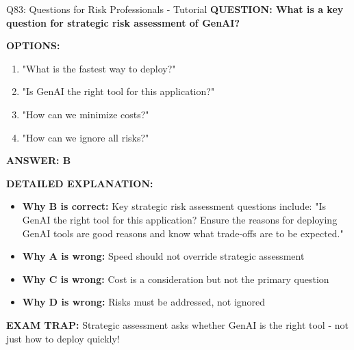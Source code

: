 \documentclass[8pt]{beamer}
\begin{document}
	\begin{frame}{Q83: Questions for Risk Professionals - Tutorial}
		\fontsize{6.5}{7.5}\selectfont
		\textbf{QUESTION: What is a key question for strategic risk assessment of GenAI?}
		
		\vspace{0.1cm}
		\textbf{OPTIONS:}
		\begin{enumerate}
			\item "What is the fastest way to deploy?"
			\item "Is GenAI the right tool for this application?"
			\item "How can we minimize costs?"
			\item "How can we ignore all risks?"
		\end{enumerate}
		
		\vspace{0.1cm}
		\textcolor{myblue}{\textbf{ANSWER: B}}
		
		\vspace{0.1cm}
		\textbf{DETAILED EXPLANATION:}
		\begin{itemize}
			\item \textbf{Why B is correct:} Key strategic risk assessment questions include: "Is GenAI the right tool for this application? Ensure the reasons for deploying GenAI tools are good reasons and know what trade-offs are to be expected."
			\item \textbf{Why A is wrong:} Speed should not override strategic assessment
			\item \textbf{Why C is wrong:} Cost is a consideration but not the primary question
			\item \textbf{Why D is wrong:} Risks must be addressed, not ignored
		\end{itemize}
		
		\textcolor{myred}{\textbf{EXAM TRAP:}} Strategic assessment asks \textcolor{myblue}{whether GenAI is the right tool} - not just how to deploy quickly!
	\end{frame}
	
\end{document}
